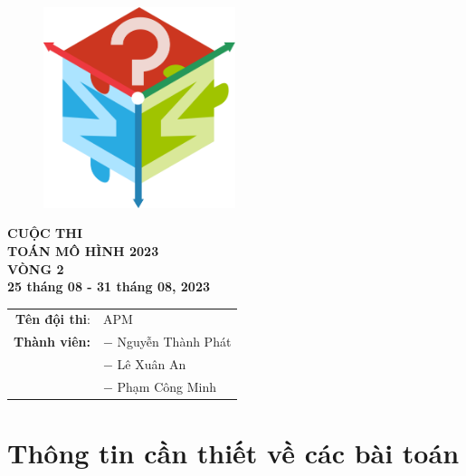 \documentclass[a4paper,12pt]{report}
\begin{document}
\thispagestyle{empty}

\begin{titlepage}
	\begin{figure}[h]
		\centering
		\includegraphics[width=0.5\textwidth]{images/logotmh.png}
	\end{figure}

	\begin{center}
		\textbf{{\Huge CUỘC THI}} \\[10pt]
		\textbf{\LARGE TOÁN MÔ HÌNH 2023}\\[10pt]
		\textbf{\LARGE VÒNG 2}\\[10pt]
		\textbf{ 25 tháng 08 - 31 tháng 08, 2023}
		\\[3.0cm]

		\begin{tabular}{r l}
			\textbf{Tên đội thi}: &APM \\
			\textbf{Thành viên:}
				&$-$ Nguyễn Thành Phát \\
				&$-$ Lê Xuân An \\
				&$-$ Phạm Công Minh
		\end{tabular}
	\end{center}

	\vspace{\fill}
\end{titlepage}

\newpage

\tableofcontents

\chapter*{Thông tin cần thiết về các bài toán}
\end{document}
